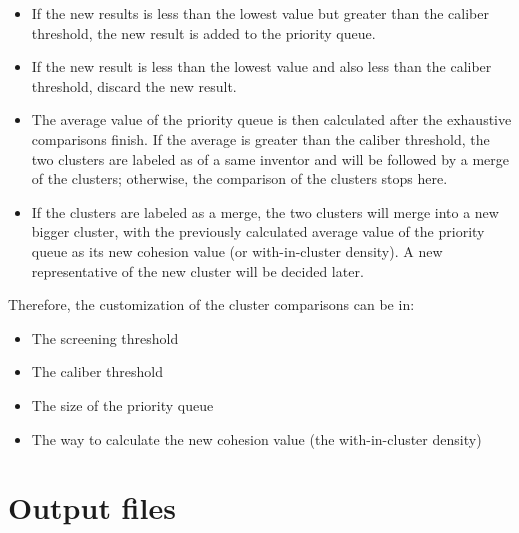 \documentclass{article}
\begin{document}
\begin{itemize}
\item If the new results is less than the lowest value but greater than the
caliber threshold, the new result is added to the priority queue.

\item If the new result is less than the lowest value and also less than the
caliber threshold, discard the new result.

\item The average value of the priority queue is then calculated after the exhaustive
comparisons finish. If the average is greater than the caliber threshold, the two
clusters are labeled as of a same inventor and will be followed by a merge of the
clusters; otherwise, the comparison of the clusters stops here.

\item If the clusters are labeled as a merge, the two clusters 
will merge into a new bigger cluster, with the previously calculated 
average value of the priority queue as its new cohesion value
(or with-in-cluster density). A new representative of the new 
cluster will be decided later.

\end{itemize}



Therefore, the customization of the cluster comparisons can be in:

\begin{itemize}

\item The screening threshold

\item The caliber threshold

\item The size of the priority queue

\item The way to calculate the new cohesion value (the with-in-cluster density)

\end{itemize}


\appendix


\section{Output files}
\end{document}
